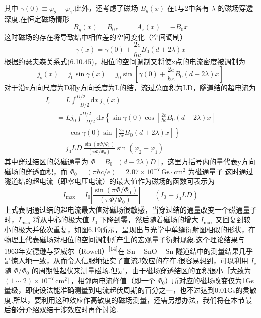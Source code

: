 其中 $\gamma(0)\equiv\varphi_{2}-\varphi_{1}$.此外，还考虑了磁场 $B_{y}(x)$ 在1与2中各有 $\lambda$ 的磁场穿透深度.在恒定磁场情形
\begin{equation*}
  B_{y}(x)=B_{0}\text{，}\qquad A_{z}(x)=-B_{0}x
\end{equation*}
这时磁场的存在将导致结中相位差的空间变化（空间调制）
\begin{equation*}
  \gamma(x)=\gamma(0)+\frac{2e}{\hbar c}B_{0}\left(d+2\lambda\right)x
\end{equation*}
根据约瑟夫森关系式(6.10.45)，相位的空间调制又将使x点的电流密度被调制为
\begin{equation*}
  j_{\mathrm{s}}(x)=j_{0}\sin\gamma(x)
  =j_{0}\sin\left[\gamma(0)
  +\frac{2e}{\hbar c}B_{0}\left(d+2\lambda\right)x\right]
\end{equation*}
对于沿x方向尺度为D和y方向长度为L的结，流过总面积为LD，隧道结的超电流为
\begin{equation}
\begin{aligned}
  I_{\mathrm{s}}&=L\int_{-D/2}^{D/2}\mathrm{d}x\,j_{\mathrm{s}}(x)\\
  &=Lj_{0}\int_{-D/2}^{D/2}\mathrm{d}x\left\{\sin\gamma(0)
  \cos\left[\frac{2e}{\hbar c}B_{0}\left(d+2\lambda\right)x\right]\right.\\
  &\quad\left.+\cos\gamma(0)
  \sin\left[\frac{2e}{\hbar c}B_{0}\left(d+2\lambda\right)x\right]\right\}\\
  &=j_{0}LD\,\frac{\sin\left(\pi\Phi/\Phi_{0}\right)}
  {\left(\pi\Phi/\Phi_{0}\right)}\sin\left(\varphi_{2}-\varphi_{1}\right)
\end{aligned}
\end{equation}
其中穿过结区的总磁通量为 $\Phi=B_{0}\left[\left(d+2\lambda\right)D\right]$，这里方括号内的量代表y方向磁场的穿透面积，而
$\Phi_{0}=\left(\pi\hbar c/e\right)=2.07\times10^{-7}\,\mathrm{Gs\cdot cm^{2}}$
为磁通量子.这时通过隧道结的超电流（即零电压电流）的最大值作为磁场的函数可表示为
\begin{equation}
  I_{\max}=I_{0}\left|\frac{\sin\left(\pi\Phi/\Phi_{0}\right)}
  {\left(\pi\Phi/\Phi_{0}\right)}\right|
  \qquad\left(I_{0}\equiv j_{0}LD\right)
\end{equation}
上式表明通过结的超电流最大值对磁场很敏感，当穿过结的通量改变一个磁通量子时，$I_{\max}$ 将从中心的极大值 $I_{0}$ 下降到零，然后随着磁场的增大 $I_{\max}$ 又回复到较小的极大并依次重复，如图6.19所示，呈现出与光学中单缝衍射图相似的形状，在物理上代表磁场对相位的空间调制所产生的宏观量子衍射现象.这个理论结果与1963年安德逊与罗威尔（Rowell）\textsuperscript{[14]}在
$\mathrm{Sn-SnO-Sn}$ 隧道结中的测量结果几乎是惊人地一致，从而令人信服地证实了直流J效应的存在.很容易想到，可以利用 $I_{\mathrm{c}}$ 随 $\Phi/\Phi_{0}$ 的周期性起伏来测量磁场.但是，由于磁场穿透结区的面积很小［大致为
$\left(1\sim2\right)\times10^{-7}\,\mathrm{cm^{2}}$］，相邻两电流峰值（即一个 $\Phi_{0}$）所对应的磁场改变仅为1Gs量级，即使设法能准确测量到电流起伏周期的百分之一，也不过达到0.01Gs的灵敏度.所以，要利用这种效应作高敏度的磁场测量，还需另想办法，我们将在本节最后部分介绍双结干涉效应时再作讨论.

